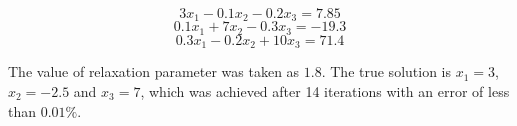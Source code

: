 \documentclass[12pt,a4paper,fleqn]{article}
\begin{document}
\begin{equation}
3x_1 - 0.1x_2 - 0.2x_3 = 7.85
\end{equation}
\begin{equation}
0.1x_1 + 7x_2 - 0.3x_3 = -19.3
\end{equation}
\begin{equation}
0.3x_1 - 0.2x_2 + 10x_3 = 71.4
\end{equation}

The value of relaxation parameter was taken as $1.8$. The true solution is $x_1
= 3$, $x_2 = -2.5$ and $x_3 = 7$, which was achieved after 14 iterations with an
error of less than $0.01\%$.
\end{document}
